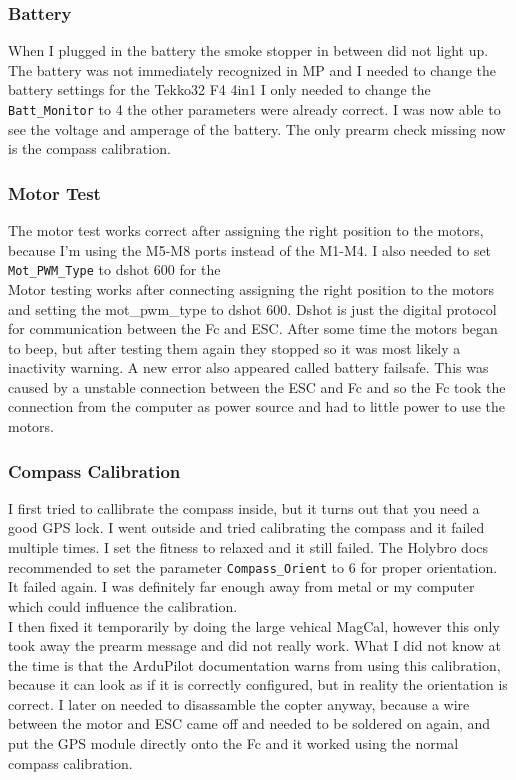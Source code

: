 \documentclass{article}
\begin{document}
	\subsubsection*{Battery}
	When I plugged in the battery the smoke stopper in between did not light up. The battery was not immediately recognized in MP and I needed to change the battery settings for the Tekko32 F4 4in1 I only needed to change the \lstinline|Batt_Monitor| to 4 the other parameters were already correct. I was now able to see the voltage and amperage of the battery.
	The only prearm check missing now is the compass calibration.
	\subsubsection{Motor Test}
	The motor test works correct after assigning the right position to the motors, because I'm using the M5-M8 ports instead of the M1-M4. I also needed to set \lstinline|Mot_PWM_Type| to dshot 600 for the 
	\\ Motor testing works after connecting assigning the right position to the motors and setting the mot\_pwm\_type to dshot 600. Dshot is just the digital protocol for communication between the Fc and ESC. After some time the motors began to beep, but after testing them again they stopped so it was most likely a inactivity warning. A new error also appeared called battery failsafe. This was caused by a unstable connection between the ESC and Fc and so the Fc took the connection from the computer as power source and had to little power to use the motors. 
	
	\subsubsection{Compass Calibration}
	I first tried to callibrate the compass inside, but it turns out that you need a good GPS lock. I went outside and tried calibrating the compass and it failed multiple times. I set the fitness to relaxed and it still failed. The Holybro docs\cite{holybrodocs} recommended to set the parameter \lstinline|Compass_Orient| to 6 for proper orientation. It failed again. I was definitely far enough away from metal or my computer which could influence the calibration.
	\\ I then fixed it temporarily by doing the large vehical MagCal, however this only took away the prearm message and did not really work. What I did not know at the time is that the ArduPilot documentation warns from using this calibration, because it can look as if it is correctly configured, but in reality the orientation is correct. 
	I later on needed to disassamble the copter anyway, because a wire between the motor and ESC came off and needed to be soldered on again, and put the GPS module directly onto the Fc and it worked using the normal compass calibration. 
	
\end{document}
